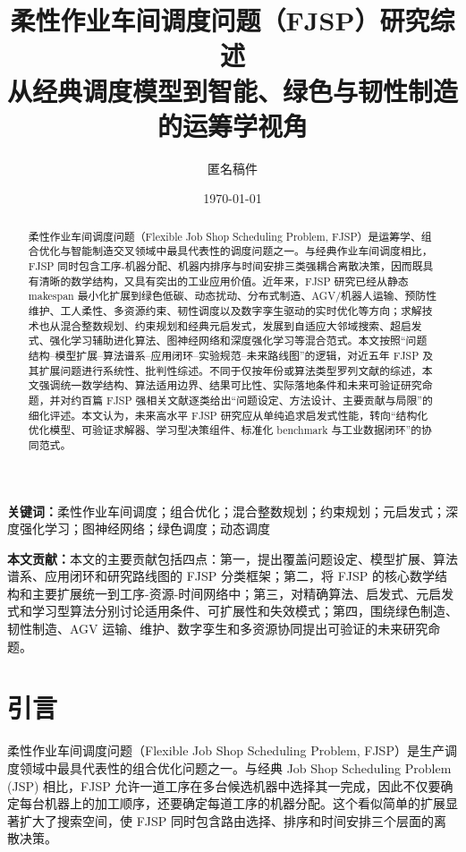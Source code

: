 \documentclass[UTF8,a4paper,11pt]{ctexart}
\title{\bfseries 柔性作业车间调度问题（FJSP）研究综述\\[0.5em]
\large 从经典调度模型到智能、绿色与韧性制造的运筹学视角}
\author{匿名稿件}
\date{\today}
\begin{document}
\maketitle
\begin{abstract}
柔性作业车间调度问题（Flexible Job Shop Scheduling Problem, FJSP）是运筹学、组合优化与智能制造交叉领域中最具代表性的调度问题之一。与经典作业车间调度相比，FJSP 同时包含工序-机器分配、机器内排序与时间安排三类强耦合离散决策，因而既具有清晰的数学结构，又具有突出的工业应用价值。近年来，FJSP 研究已经从静态 makespan 最小化扩展到绿色低碳、动态扰动、分布式制造、AGV/机器人运输、预防性维护、工人柔性、多资源约束、韧性调度以及数字孪生驱动的实时优化等方向；求解技术也从混合整数规划、约束规划和经典元启发式，发展到自适应大邻域搜索、超启发式、强化学习辅助进化算法、图神经网络和深度强化学习等混合范式。本文按照“问题结构--模型扩展--算法谱系--应用闭环--实验规范--未来路线图”的逻辑，对近五年 FJSP 及其扩展问题进行系统性、批判性综述。不同于仅按年份或算法类型罗列文献的综述，本文强调统一数学结构、算法适用边界、结果可比性、实际落地条件和未来可验证研究命题，并对约百篇 FJSP 强相关文献逐类给出“问题设定、方法设计、主要贡献与局限”的细化评述。本文认为，未来高水平 FJSP 研究应从单纯追求启发式性能，转向“结构化优化模型、可验证求解器、学习型决策组件、标准化 benchmark 与工业数据闭环”的协同范式。
\end{abstract}

\noindent\textbf{关键词：}柔性作业车间调度；组合优化；混合整数规划；约束规划；元启发式；深度强化学习；图神经网络；绿色调度；动态调度

\vspace{0.8em}
\noindent\textbf{本文贡献：}本文的主要贡献包括四点：第一，提出覆盖问题设定、模型扩展、算法谱系、应用闭环和研究路线图的 FJSP 分类框架；第二，将 FJSP 的核心数学结构和主要扩展统一到工序-资源-时间网络中；第三，对精确算法、启发式、元启发式和学习型算法分别讨论适用条件、可扩展性和失效模式；第四，围绕绿色制造、韧性制造、AGV 运输、维护、数字孪生和多资源协同提出可验证的未来研究命题。

\tableofcontents
\newpage

\section{引言}

柔性作业车间调度问题（Flexible Job Shop Scheduling Problem, FJSP）是生产调度领域中最具代表性的组合优化问题之一。与经典 Job Shop Scheduling Problem (JSP) 相比，FJSP 允许一道工序在多台候选机器中选择其一完成，因此不仅要确定每台机器上的加工顺序，还要确定每道工序的机器分配。这个看似简单的扩展显著扩大了搜索空间，使 FJSP 同时包含路由选择、排序和时间安排三个层面的离散决策。
\end{document}
